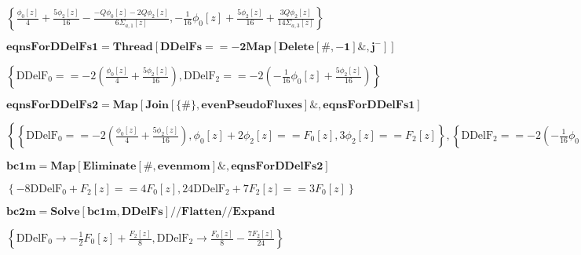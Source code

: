 \documentclass{article}
\begin{document}
\begin{doublespace}
\noindent\(\left\{\frac{\phi _0[z]}{4}+\frac{5 \phi _2[z]}{16}-\frac{-Q \phi _0[z]-2 Q \phi _2[z]}{6 \Sigma _{a,1}[z]},-\frac{1}{16} \phi _0[z]+\frac{5
\phi _2[z]}{16}+\frac{3 Q \phi _2[z]}{14 \Sigma _{a,3}[z]}\right\}\)
\end{doublespace}

\begin{doublespace}
\noindent\(\pmb{\text{eqnsForDDelFs1}=\text{Thread}\left[\text{DDelFs}==-2\text{Map}\left[\text{Delete}[\#,-1]\&,j^-\right]\right]}\)
\end{doublespace}

\begin{doublespace}
\noindent\(\left\{\text{DDelF}_0==-2 \left(\frac{\phi _0[z]}{4}+\frac{5 \phi _2[z]}{16}\right),\text{DDelF}_2==-2 \left(-\frac{1}{16} \phi _0[z]+\frac{5
\phi _2[z]}{16}\right)\right\}\)
\end{doublespace}

\begin{doublespace}
\noindent\(\pmb{\text{eqnsForDDelFs2}=\text{Map}[\text{Join}[\{\#\},\text{evenPseudoFluxes}]\&,\text{eqnsForDDelFs1}]}\)
\end{doublespace}

\begin{doublespace}
\noindent\(\left\{\left\{\text{DDelF}_0==-2 \left(\frac{\phi _0[z]}{4}+\frac{5 \phi _2[z]}{16}\right),\phi _0[z]+2 \phi _2[z]==F_0[z],3 \phi _2[z]==F_2[z]\right\},\left\{\text{DDelF}_2==-2
\left(-\frac{1}{16} \phi _0[z]+\frac{5 \phi _2[z]}{16}\right),\phi _0[z]+2 \phi _2[z]==F_0[z],3 \phi _2[z]==F_2[z]\right\}\right\}\)
\end{doublespace}

\begin{doublespace}
\noindent\(\pmb{\text{bc1m}=\text{Map}[\text{Eliminate}[\#,\text{evenmom}]\&,\text{eqnsForDDelFs2}]}\)
\end{doublespace}

\begin{doublespace}
\noindent\(\left\{-8 \text{DDelF}_0+F_2[z]==4 F_0[z],24 \text{DDelF}_2+7 F_2[z]==3 F_0[z]\right\}\)
\end{doublespace}

\begin{doublespace}
\noindent\(\pmb{\text{bc2m}=\text{Solve}[\text{bc1m},\text{DDelFs}]\text{//}\text{Flatten}\text{//}\text{Expand}}\)
\end{doublespace}

\begin{doublespace}
\noindent\(\left\{\text{DDelF}_0\to -\frac{1}{2} F_0[z]+\frac{F_2[z]}{8},\text{DDelF}_2\to \frac{F_0[z]}{8}-\frac{7 F_2[z]}{24}\right\}\)
\end{doublespace}
\end{document}
